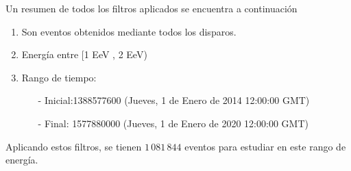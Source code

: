 	Un resumen de todos los filtros aplicados se encuentra a continuación
		\begin{enumerate}
			\item Son eventos obtenidos mediante todos los disparos.
			\item Energía entre  [1 EeV , 2 EeV)
			\item Rango de tiempo:
			\begin{itemize}
				\item[-] Inicial:1388577600 (Jueves, 1 de Enero de 2014 12:00:00 GMT)
				\item[-] Final: 1577880000  (Jueves, 1 de Enero de 2020 12:00:00 GMT)
			\end{itemize}

		\end{enumerate}
	Aplicando estos filtros, se tienen $1\,081\,844$ eventos para estudiar en este rango de energía. 



